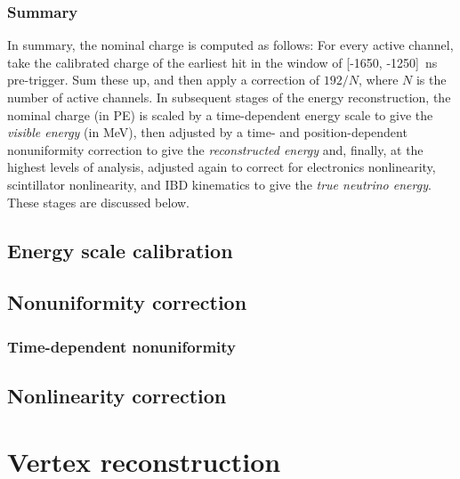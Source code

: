 \documentclass[../thesis.tex]{subfiles}
\begin{document}
\subsubsection{Summary}
\label{sec:reconChargeSummary}

In summary, the nominal charge is computed as follows: For every active channel,
take the calibrated charge of the earliest hit in the window of [-1650,
-1250]~ns pre-trigger. Sum these up, and then apply a correction of $192/N$,
where $N$ is the number of active channels. In subsequent stages of the energy
reconstruction, the nominal charge (in PE) is scaled by a time-dependent energy
scale to give the \emph{visible energy} (in MeV), then adjusted by a time- and
position-dependent nonuniformity correction to give the \emph{reconstructed
  energy} and, finally, at the highest levels of analysis, adjusted again to
correct for electronics nonlinearity, scintillator nonlinearity, and IBD
kinematics to give the \emph{true neutrino energy}. These stages are discussed
below.

\subsection{Energy scale calibration}
\label{sec:reconEnergyScale}

\subsection{Nonuniformity correction}
\label{sec:reconEnergyNU}

\subsubsection{Time-dependent nonuniformity}
\label{sec:reconEnergyTDNU}

\subsection{Nonlinearity correction}
\label{sec:reconEnergyNL}

\section{Vertex reconstruction}
\label{sec:reconVertex}
\end{document}

